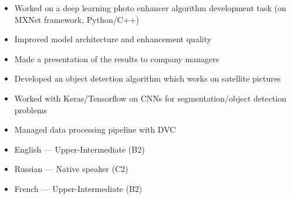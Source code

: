 \documentclass[10pt,a4paper,ragged2e]{altacv}
\begin{document}
%


\begin{itemize}
    \item Worked on a deep learning photo enhancer algorithm development task (on MXNet framework, Python/C++)
    \item Improved model architecture and enhancement quality
    \item Made a presentation of the results to company managers
\end{itemize}
\divider

\begin{itemize}
	\item Developed an object detection algorithm which works on satellite pictures
	\item Worked with Keras/Tensorflow on CNNs for segmentation/object detection problems
	\item Managed data processing pipeline with DVC
\end{itemize}

\begin{itemize}
	\item English --- Upper-Intermediate (B2)
	\item Russian --- Native speaker (C2)
	\item French --- Upper-Intermediate (B2)
\end{itemize}





\end{document}
